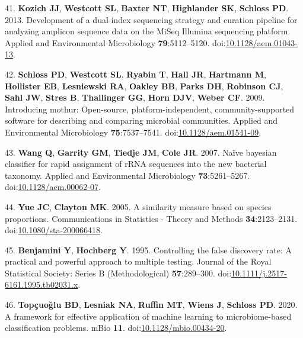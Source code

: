 \documentclass[11pt,]{article}
\newlength{\cslhangindent}
\newenvironment{cslreferences}%
  {\setlength{\parindent}{0pt}%
  \everypar{\setlength{\hangindent}{\cslhangindent}}\ignorespaces}%
  {\par}
\begin{document}
\begin{cslreferences}
\leavevmode\hypertarget{ref-kozich2013}{}%
41. \textbf{Kozich JJ}, \textbf{Westcott SL}, \textbf{Baxter NT},
\textbf{Highlander SK}, \textbf{Schloss PD}. 2013. Development of a
dual-index sequencing strategy and curation pipeline for analyzing
amplicon sequence data on the MiSeq Illumina sequencing platform.
Applied and Environmental Microbiology \textbf{79}:5112--5120.
doi:\href{https://doi.org/10.1128/aem.01043-13}{10.1128/aem.01043-13}.

\leavevmode\hypertarget{ref-schloss2009}{}%
42. \textbf{Schloss PD}, \textbf{Westcott SL}, \textbf{Ryabin T},
\textbf{Hall JR}, \textbf{Hartmann M}, \textbf{Hollister EB},
\textbf{Lesniewski RA}, \textbf{Oakley BB}, \textbf{Parks DH},
\textbf{Robinson CJ}, \textbf{Sahl JW}, \textbf{Stres B},
\textbf{Thallinger GG}, \textbf{Horn DJV}, \textbf{Weber CF}. 2009.
Introducing mothur: Open-source, platform-independent,
community-supported software for describing and comparing microbial
communities. Applied and Environmental Microbiology
\textbf{75}:7537--7541.
doi:\href{https://doi.org/10.1128/aem.01541-09}{10.1128/aem.01541-09}.

\leavevmode\hypertarget{ref-wang2007}{}%
43. \textbf{Wang Q}, \textbf{Garrity GM}, \textbf{Tiedje JM},
\textbf{Cole JR}. 2007. Naïve bayesian classifier for rapid assignment
of rRNA sequences into the new bacterial taxonomy. Applied and
Environmental Microbiology \textbf{73}:5261--5267.
doi:\href{https://doi.org/10.1128/aem.00062-07}{10.1128/aem.00062-07}.

\leavevmode\hypertarget{ref-yue2005}{}%
44. \textbf{Yue JC}, \textbf{Clayton MK}. 2005. A similarity measure
based on species proportions. Communications in Statistics - Theory and
Methods \textbf{34}:2123--2131.
doi:\href{https://doi.org/10.1080/sta-200066418}{10.1080/sta-200066418}.

\leavevmode\hypertarget{ref-benjamini1995}{}%
45. \textbf{Benjamini Y}, \textbf{Hochberg Y}. 1995. Controlling the
false discovery rate: A practical and powerful approach to multiple
testing. Journal of the Royal Statistical Society: Series B
(Methodological) \textbf{57}:289--300.
doi:\href{https://doi.org/10.1111/j.2517-6161.1995.tb02031.x}{10.1111/j.2517-6161.1995.tb02031.x}.

\leavevmode\hypertarget{ref-topcuoglu2020}{}%
46. \textbf{Topçuoğlu BD}, \textbf{Lesniak NA}, \textbf{Ruffin MT},
\textbf{Wiens J}, \textbf{Schloss PD}. 2020. A framework for effective
application of machine learning to microbiome-based classification
problems. mBio \textbf{11}.
doi:\href{https://doi.org/10.1128/mbio.00434-20}{10.1128/mbio.00434-20}.
\end{cslreferences}
\end{document}
